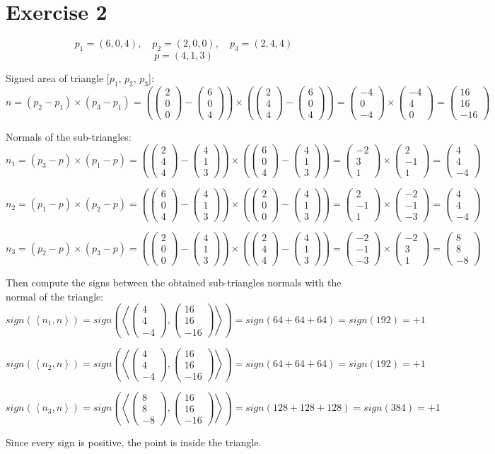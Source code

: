 \documentclass[tikz,14pt,fleqn]{article}
\newcommand{\pvec}[3]{
   \ensuremath{
   \begin{pmatrix}
       #1 \\
       #2 \\
       #3
   \end{pmatrix}
}}
\newcommand{\dotprod}[2]{\ensuremath{\left< #1, #2 \right>}}
\begin{document}
\section{Exercise 2}


\[
   p_1 = (6, 0, 4),\quad p_2 = (2, 0, 0),\quad p_3 = (2, 4, 4)
\]
\[
   p = (4, 1, 3)
\]

Signed area of triangle [$p_1$, $p_2$, $p_3$]:
\[
   n = (p_2 - p_1) \times (p_3 - p_1) = 
   \left(
   \pvec{2}{0}{0} - \pvec{6}{0}{4}
   \right)
   \times
   \left(
   \pvec{2}{4}{4} - \pvec{6}{0}{4}
   \right) =
   \pvec{-4}{0}{-4}
   \times
   \pvec{-4}{4}{0}
   =
   \pvec{16}{16}{-16}
\]


Normals of the sub-triangles:
\[
   n_1 = (p_3 - p) \times (p_1 - p) =
   \left(
   \pvec{2}{4}{4} - \pvec{4}{1}{3}
   \right)
   \times
   \left(
   \pvec{6}{0}{4} - \pvec{4}{1}{3}
   \right) =
   \pvec{-2}{3}{1}
   \times
   \pvec{2}{-1}{1}
   =
   \pvec{4}{4}{-4}
\]



\[
   n_2 = (p_1 - p) \times (p_2 - p) =
   \left(
   \pvec{6}{0}{4} - \pvec{4}{1}{3}
   \right)
   \times
   \left(
   \pvec{2}{0}{0} - \pvec{4}{1}{3}
   \right) =
   \pvec{2}{-1}{1}
   \times
   \pvec{-2}{-1}{-3}
   =
   \pvec{4}{4}{-4}
\]


\[
  n_3 = (p_2 - p) \times (p_3 - p) =
   \left(
   \pvec{2}{0}{0} - \pvec{4}{1}{3}
   \right)
   \times 
   \left(
   \pvec{2}{4}{4} - \pvec{4}{1}{3}
   \right) =
   \pvec{-2}{-1}{-3}
   \times
   \pvec{-2}{3}{1}
   =
   \pvec{8}{8}{-8}
\]


Then compute the signs between the obtained sub-triangles normals with the normal of the triangle:
\[
   sign(\dotprod{n_1}{n}) = 
   sign
   \left(
   \dotprod{\pvec{4}{4}{-4}}{\pvec{16}{16}{-16}}
   \right) = 
   sign(64 + 64 + 64 ) = sign(192) = +1
\]

\[
   sign(\dotprod{n_2}{n}) = 
   sign
   \left(
   \dotprod{\pvec{4}{4}{-4}}{\pvec{16}{16}{-16}}
   \right) = 
   sign(64 +64 +64 ) = sign(192) = +1
\]

\[
   sign(\dotprod{n_3}{n}) = 
   sign
   \left(
   \dotprod{\pvec{8}{8}{-8}}{\pvec{16}{16}{-16}}
   \right) = 
   sign(128 + 128 + 128) = sign(384) = +1
\]

Since every sign is positive, the point is inside the triangle.
\end{document}
